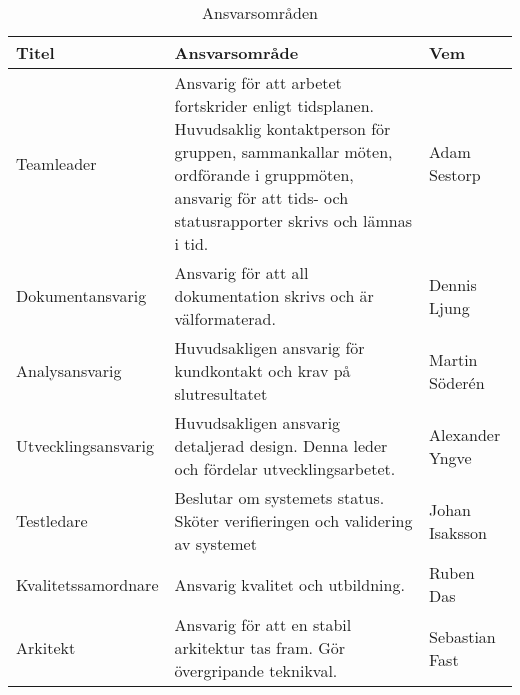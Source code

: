 \begin{table}[h]
  \centering
    \begin{tabularx}{\textwidth}{| l | X | l |}
      \hline
      \textbf{Titel} & \textbf{Ansvarsområde} & \textbf{Vem} \\
      \hline
      {Teamleader} & {Ansvarig för att arbetet fortskrider enligt tidsplanen. Huvudsaklig kontaktperson för gruppen, sammankallar möten, ordförande i gruppmöten, ansvarig för att tids- och statusrapporter skrivs och lämnas i tid.} & {Adam Sestorp} \\\hline
      
      {Dokumentansvarig} & {Ansvarig för att all dokumentation skrivs och är välformaterad.} & {Dennis Ljung} \\\hline
      
      {Analysansvarig} & {Huvudsakligen ansvarig för kundkontakt och krav på slutresultatet} & {Martin Söderén} \\\hline
      
      {Utvecklingsansvarig} & {Huvudsakligen ansvarig detaljerad design. Denna leder och fördelar utvecklingsarbetet. } & {Alexander Yngve} \\\hline
      
      {Testledare} & {Beslutar om systemets status. Sköter verifieringen och validering av systemet} & {Johan Isaksson} \\\hline
      
      {Kvalitetssamordnare} & {Ansvarig kvalitet och utbildning.} & {Ruben Das} \\\hline
      
        {Arkitekt} & {Ansvarig för att en stabil arkitektur tas fram. Gör övergripande teknikval. } & {Sebastian Fast} \\\hline
    \end{tabularx}
  \caption{Ansvarsområden} \label{projektplan:ansvarsomraden}
\end{table}

\newpage